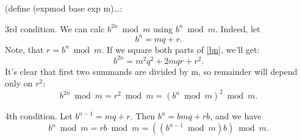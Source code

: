 \documentclass[a4paper,10pt]{article}
\begin{document}
(define (expmod base exp m)\ldots:

3rd condition. We can calc $b^{2n} \bmod m$ using $b^n \bmod m$. Indeed, let
\begin{equation}\label{bn}
b^n = mq + r.
\end{equation}
Note, that $r = b^n \bmod m$. If we square both parts of \eqref{bn}, we'll get:
\begin{equation*}
  b^{2n} = m^2q^2+2mqr + r^2.
\end{equation*}
It's clear that first two summands are divided by m, so remainder will depend only on $r^2$:
\begin{equation*}
    b^{2n} \bmod m = r^2 \bmod m = (b^n \bmod m)^2 \bmod m.
\end{equation*}

4th condition. Let $b^{n-1}=mq+r$. Then $b^n=bmq+rb$, and we have
\begin{equation*}
  b^n \bmod m = rb \bmod m = ((b^{n-1} \bmod m)b) \bmod m.
\end{equation*}
\end{document}
